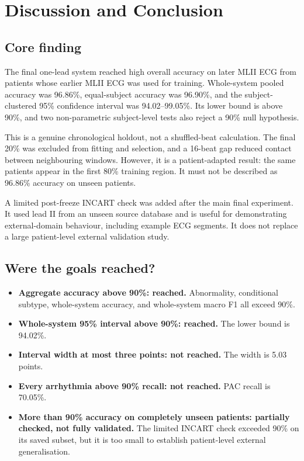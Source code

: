 \chapter{Discussion and Conclusion}\label{ch:conclusion}

\section{Core finding}

The final one-lead system reached high overall accuracy on later MLII ECG from
patients whose earlier MLII ECG was used for training. Whole-system pooled
accuracy was 96.86\%, equal-subject accuracy was 96.90\%, and the
subject-clustered 95\% confidence interval was 94.02--99.05\%. Its lower bound
is above 90\%, and two non-parametric subject-level tests also reject a 90\%
null hypothesis.

This is a genuine chronological holdout, not a shuffled-beat calculation. The
final 20\% was excluded from fitting and selection, and a 16-beat gap reduced
contact between neighbouring windows. However, it is a patient-adapted result:
the same patients appear in the first 80\% training region. It must not be
described as 96.86\% accuracy on unseen patients.

A limited post-freeze INCART check was added after the main final experiment.
It used lead II from an unseen source database and is useful for demonstrating
external-domain behaviour, including example ECG segments. It does not replace
a large patient-level external validation study.

\section{Were the goals reached?}

\begin{itemize}
    \item \textbf{Aggregate accuracy above 90\%: reached.} Abnormality,
    conditional subtype, whole-system accuracy, and whole-system macro F1 all
    exceed 90\%.
    \item \textbf{Whole-system 95\% interval above 90\%: reached.} The lower
    bound is 94.02\%.
    \item \textbf{Interval width at most three points: not reached.} The width
    is 5.03 points.
    \item \textbf{Every arrhythmia above 90\% recall: not reached.} PAC recall
    is 70.05\%.
    \item \textbf{More than 90\% accuracy on completely unseen patients:
    partially checked, not fully validated.} The limited INCART check exceeded
    90\% on its saved subset, but it is too small to establish patient-level
    external generalisation.
\end{itemize}

